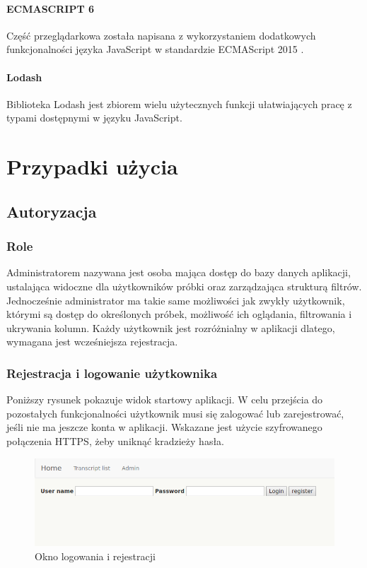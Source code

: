 \documentclass[a4paper,12pt,twoside]{article}
\begin{document}
\paragraph{ECMASCRIPT 6} Część przeglądarkowa została napisana z wykorzystaniem
dodatkowych funkcjonalności języka JavaScript w standardzie ECMAScript 2015 \cite{ecma}.

\paragraph{Lodash} Biblioteka Lodash \cite{lodash} jest zbiorem wielu użytecznych funkcji ułatwiających pracę z typami dostępnymi w języku JavaScript.

\newpage

\section{Przypadki użycia}
\subsection{Autoryzacja}
\subsubsection{Role}
Administratorem nazywana jest osoba mająca dostęp do bazy danych aplikacji, ustalająca
widoczne dla użytkowników próbki oraz zarządzająca strukturą filtrów.
Jednocześnie administrator ma takie same możliwości jak zwykły użytkownik, którymi są dostęp do określonych próbek, możliwość ich oglądania, filtrowania i ukrywania kolumn.
Każdy użytkownik jest rozróżnialny w aplikacji dlatego, wymagana jest wcześniejsza rejestracja.

\subsubsection{Rejestracja i logowanie użytkownika}
Poniższy rysunek pokazuje widok startowy aplikacji. W celu przejścia do pozostałych funkcjonalności użytkownik musi się zalogować lub zarejestrować, jeśli nie ma jeszcze
konta w aplikacji. Wskazane jest użycie szyfrowanego połączenia HTTPS, żeby uniknąć
kradzieży hasła.

\begin{figure}[h!]
\includegraphics[width=\linewidth]{obrazy/aplikacja/login.png}
\caption{Okno logowania i rejestracji}
\label{fig:loginpic}
\end{figure}
\end{document}
